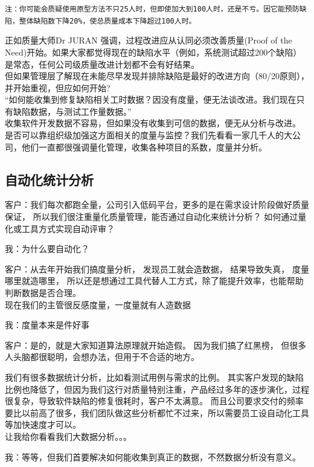 \texttt{注：你可能会质疑使用原型方法不只25人时，但即使加大到100人时，还是不亏。因它能预防缺陷，整体缺陷数下降20\%，使总质量成本下降超过100人时。}

正如质量大师Dr JURAN 强调，过程改进应从认同必须改善质量(Proof of the
Need)开始。如果大家都觉得现在的缺陷水平（例如，系统测试超过200个缺陷）是常态，任何公司级质量改进计划都不会有好结果。\\
但如果管理层了解现在未能尽早发现并排除缺陷是最好的改进方向（80/20原则），并开始重视，但应如何开始?\\
``如何能收集到修复缺陷相关工时数据？因没有度量，便无法谈改进。我们现在只有缺陷数据，与测试工作量数据。''\\
收集软件开发数据不容易，但如果没有收集到可信的数据，便无从分析与改进。\\
是否可以靠组织级加强这方面相关的度量与监控？我们先看看一家几千人的大公司，他们一直都很强调量化管理，收集各种项目的系数，度量并分析。\\

\hypertarget{ux81eaux52a8ux5316ux7edfux8ba1ux5206ux6790}{%
\subsection{自动化统计分析}\label{ux81eaux52a8ux5316ux7edfux8ba1ux5206ux6790}}

客户：我们每次都跑全量，公司引入低码平台，更多的是在需求设计阶段做好质量保证，
所以我们很注重量化质量管理，能否通过自动化来统计分析？
如何通过量化或工具方式实现自动评审？

我：为什么要自动化？

客户：从去年开始我们搞度量分析， 发现员工就会造数据， 结果导致失真，
度量哪里就造哪里，
所以还是想通过工具代替人工方式，除了能提升效率，也能帮助判断数据是否合理。\\
现在我们的主管很反感度量，一度量就有人造数据

我：度量本来是件好事

客户：是的，就是大家知道算法原理就开始造假。 因为我们搞了红黑榜，
但很多人头脑都很聪明，会想办法，但用于不合适的地方。

我们有很多数据统计分析，比如看测试用例与需求的比例。
其实客户发现的缺陷比例也降低了，但因为我们这行对质量特别注重，产品经过多年的逐步演化，过程很复杂，导致软件缺陷的修复很耗时，客户不太满意。
而且公司要求交付的频率要比以前高了很多，我们团队做这些分析都忙不过来，所以需要员工设自动化工具等加快速度才可以。\\
让我给你看看我们大数据分析。。。

我：等等，但我们首要解决如何能收集到真正的数据，不然数据分析没有意义。

